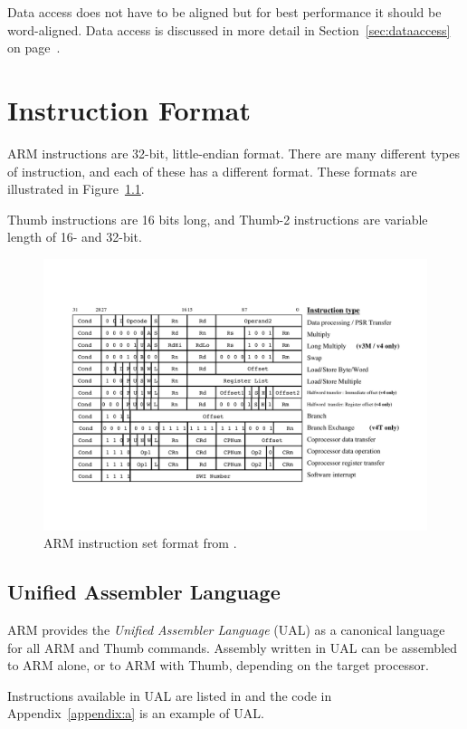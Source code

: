 \documentclass[oneside,a4paper]{report}
\begin{document}
Data access does not have to be aligned but for best performance it should be word-aligned. Data access is discussed in more detail in Section~\ref{sec:dataaccess} on page~\pageref{sec:dataaccess}.



\chapter{Instruction Format}

ARM instructions are 32-bit, little-endian format. There are many different types of instruction, and each of these has a different format. These formats are illustrated in Figure~\ref{fig:instructionformat}.

Thumb instructions are 16 bits long, and Thumb-2 instructions are variable length of 16- and 32-bit.

\begin{figure}[htbp]
	\centering
	\includegraphics[width=1.0\textwidth]{./fig/InstructionFormat.pdf}
	\caption{ARM instruction set format from \cite[p. 13]{ARMInst}.}
	\label{fig:instructionformat}
\end{figure}

\section{Unified Assembler Language}
ARM provides the \emph{Unified Assembler Language} (UAL) as a canonical language for all ARM and Thumb commands. Assembly written in UAL can be assembled to ARM alone, or to ARM with Thumb, depending on the target processor.

Instructions available in UAL are listed in \cite{ARMRef} and the code in Appendix~\ref{appendix:a} is an example of UAL.
\end{document}
